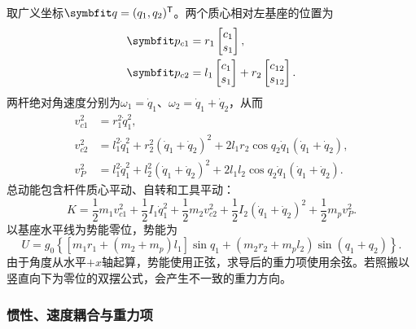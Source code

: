 取广义坐标$\vect q=(q_1,q_2)^\T$。两个质心相对左基座的位置为
\begin{align}
\vect p_{c1}&=r_1\begin{bmatrix}c_1\\s_1\end{bmatrix},\\
\vect p_{c2}&=l_1\begin{bmatrix}c_1\\s_1\end{bmatrix}+r_2\begin{bmatrix}c_{12}\\s_{12}\end{bmatrix}.
\end{align}
两杆绝对角速度分别为$\omega_1=\dot q_1$、$\omega_2=\dot q_1+\dot q_2$，从而
\begin{align}
v_{c1}^2&=r_1^2\dot q_1^2,\\
v_{c2}^2&=l_1^2\dot q_1^2+r_2^2(\dot q_1+\dot q_2)^2
+2l_1r_2\cos q_2\dot q_1(\dot q_1+\dot q_2),\\
v_P^2&=l_1^2\dot q_1^2+l_2^2(\dot q_1+\dot q_2)^2
+2l_1l_2\cos q_2\dot q_1(\dot q_1+\dot q_2).
\end{align}
总动能包含杆件质心平动、自转和工具平动：
\begin{equation}
K=\frac12m_1v_{c1}^2+\frac12I_1\dot q_1^2
+\frac12m_2v_{c2}^2+\frac12I_2(\dot q_1+\dot q_2)^2+\frac12m_pv_P^2.
\end{equation}
以基座水平线为势能零位，势能为
\begin{equation}
U=g_0\left\{[m_1r_1+(m_2+m_p)l_1]\sin q_1
+(m_2r_2+m_pl_2)\sin(q_1+q_2)\right\}.
\label{eq:potential}
\end{equation}
由于角度从水平$+x$轴起算，势能使用正弦，求导后的重力项使用余弦。若照搬以竖直向下为零位的双摆公式，会产生不一致的重力方向。

\subsubsection{惯性、速度耦合与重力项}

